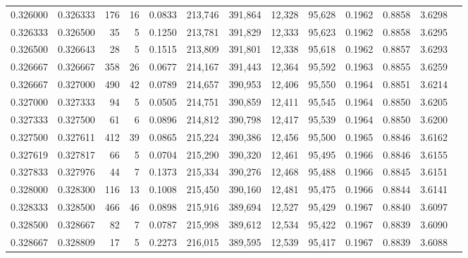 \begin{tabular}{rrrrrrrrrrrrr}
0.326000 & 0.326333 &   176 &  16 &                                     0.0833 & 213,746 & 391,864 &  12,328 &  95,628 & 0.1962 & 0.8858 & 3.6298 \\
0.326333 & 0.326500 &    35 &   5 &                                     0.1250 & 213,781 & 391,829 &  12,333 &  95,623 & 0.1962 & 0.8858 & 3.6295 \\
0.326500 & 0.326643 &    28 &   5 &                                     0.1515 & 213,809 & 391,801 &  12,338 &  95,618 & 0.1962 & 0.8857 & 3.6293 \\
0.326667 & 0.326667 &   358 &  26 &                                     0.0677 & 214,167 & 391,443 &  12,364 &  95,592 & 0.1963 & 0.8855 & 3.6259 \\
0.326667 & 0.327000 &   490 &  42 &                                     0.0789 & 214,657 & 390,953 &  12,406 &  95,550 & 0.1964 & 0.8851 & 3.6214 \\
0.327000 & 0.327333 &    94 &   5 &                                     0.0505 & 214,751 & 390,859 &  12,411 &  95,545 & 0.1964 & 0.8850 & 3.6205 \\
0.327333 & 0.327500 &    61 &   6 &                                     0.0896 & 214,812 & 390,798 &  12,417 &  95,539 & 0.1964 & 0.8850 & 3.6200 \\
0.327500 & 0.327611 &   412 &  39 &                                     0.0865 & 215,224 & 390,386 &  12,456 &  95,500 & 0.1965 & 0.8846 & 3.6162 \\
0.327619 & 0.327817 &    66 &   5 &                                     0.0704 & 215,290 & 390,320 &  12,461 &  95,495 & 0.1966 & 0.8846 & 3.6155 \\
0.327833 & 0.327976 &    44 &   7 &                                     0.1373 & 215,334 & 390,276 &  12,468 &  95,488 & 0.1966 & 0.8845 & 3.6151 \\
0.328000 & 0.328300 &   116 &  13 &                                     0.1008 & 215,450 & 390,160 &  12,481 &  95,475 & 0.1966 & 0.8844 & 3.6141 \\
0.328333 & 0.328500 &   466 &  46 &                                     0.0898 & 215,916 & 389,694 &  12,527 &  95,429 & 0.1967 & 0.8840 & 3.6097 \\
0.328500 & 0.328667 &    82 &   7 &                                     0.0787 & 215,998 & 389,612 &  12,534 &  95,422 & 0.1967 & 0.8839 & 3.6090 \\
0.328667 & 0.328809 &    17 &   5 &                                     0.2273 & 216,015 & 389,595 &  12,539 &  95,417 & 0.1967 & 0.8839 & 3.6088 \\

\end{tabular}
